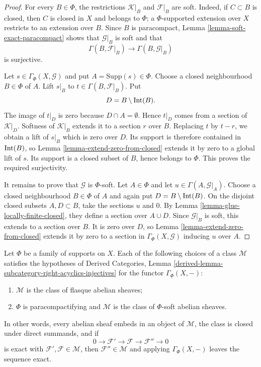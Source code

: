 \begin{proof}
For every $B \in \Phi$, the restrictions
$\mathcal{K}|_B$ and $\mathcal{F}|_B$ are soft. Indeed, if
$C \subset B$ is closed, then $C$ is closed in $X$ and belongs to
$\Phi$; a $\Phi$-supported extension over $X$ restricts to an extension
over $B$. Since $B$ is paracompact, Lemma
\ref{lemma-soft-exact-paracompact} shows that
$\mathcal{G}|_B$ is soft and that
$$
\Gamma(B, \mathcal{F}|_B) \longrightarrow
\Gamma(B, \mathcal{G}|_B)
$$
is surjective.

Let $s \in \Gamma_\Phi(X, \mathcal{G})$ and put
$A = \text{Supp}(s) \in \Phi$. Choose a closed neighbourhood
$B \in \Phi$ of $A$. Lift $s|_B$ to
$t \in \Gamma(B, \mathcal{F}|_B)$. Put
$$
D = B \setminus \mathop{\rm Int}(B).
$$
The image of $t|_D$ is zero because $D \cap A = \emptyset$. Hence
$t|_D$ comes from a section of $\mathcal{K}|_D$. Softness of
$\mathcal{K}|_B$ extends it to a section $r$ over $B$. Replacing $t$
by $t-r$, we obtain a lift of $s|_B$ which is zero over $D$. Its
support is therefore contained in $\mathop{\rm Int}(B)$, so Lemma
\ref{lemma-extend-zero-from-closed} extends it by zero to a global lift
of $s$. Its support is a closed subset of $B$, hence belongs to $\Phi$.
This proves the required surjectivity.

It remains to prove that $\mathcal{G}$ is $\Phi$-soft. Let
$A \in \Phi$ and let
$u \in \Gamma(A, \mathcal{G}|_A)$. Choose a closed neighbourhood
$B \in \Phi$ of $A$ and again put
$D = B \setminus \mathop{\rm Int}(B)$. On the disjoint closed subsets
$A,D \subset B$, take the sections $u$ and $0$. By Lemma
\ref{lemma-glue-locally-finite-closed}, they define a section over
$A \cup D$. Since $\mathcal{G}|_B$ is soft, this extends to a section
over $B$. It is zero over $D$, so Lemma
\ref{lemma-extend-zero-from-closed} extends it by zero to a section in
$\Gamma_\Phi(X, \mathcal{G})$ inducing $u$ over $A$.
\end{proof}

\begin{lemma}
\label{lemma-family-supports-acyclic-classes}
\begin{reference}
\cite[Chapter III, \S 3.3, Proposition 3.3.2, p. 159]{Tohoku}
\end{reference}
Let $\Phi$ be a family of supports on $X$. Each of the following choices
of a class $\mathcal{M}$ satisfies the hypotheses of Derived Categories,
Lemma \ref{derived-lemma-subcategory-right-acyclics-injectives} for the
functor $\Gamma_\Phi(X,-)$:
\begin{enumerate}
\item $\mathcal{M}$ is the class of flasque abelian sheaves;
\item $\Phi$ is paracompactifying and $\mathcal{M}$ is the class of
$\Phi$-soft abelian sheaves.
\end{enumerate}
In other words, every abelian sheaf embeds in an object of
$\mathcal{M}$, the class is closed under direct summands, and if
$$
0 \longrightarrow \mathcal{F}' \longrightarrow \mathcal{F}
\longrightarrow \mathcal{F}'' \longrightarrow 0
$$
is exact with $\mathcal{F}',\mathcal{F} \in \mathcal{M}$, then
$\mathcal{F}'' \in \mathcal{M}$ and applying $\Gamma_\Phi(X,-)$ leaves
the sequence exact.
\end{lemma}

